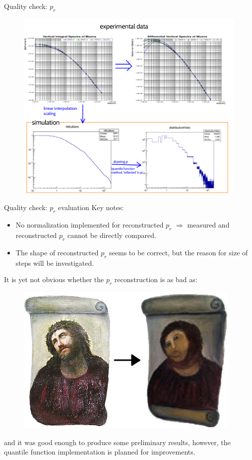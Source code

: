 \documentclass{beamer}
\begin{document}
\begin{frame}{Quality check: $p_r$}
\begin{figure}
\includegraphics[width=.77\textwidth]{images/pr_distr.png}
\end{figure}
\end{frame}

\begin{frame}{Quality check: $p_r$ evaluation}
Key notes:
\begin{itemize}
\item No normalization implemented for reconstructed $p_r$ $\Rightarrow$ measured and reconstructed $p_r$ cannot be directly compared.
\item The shape of reconstructed $p_r$ seems to be correct, but the reason for size of steps will be investigated.
\end{itemize}

It is yet not obvious whether the $p_r$ reconstruction is as bad as:
\begin{figure}
\includegraphics[width=.3\textwidth]{images/Ecce_Homo.jpg}
\end{figure}
and it was good enough to produce some preliminary results, however, the quantile function implementation is planned for improvements.
\end{frame}
\end{document}

